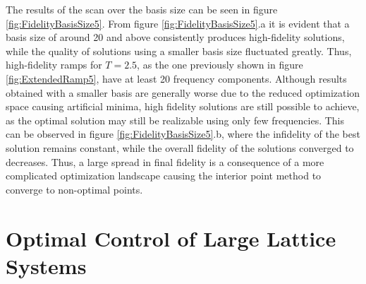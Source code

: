 The results of the scan over the basis size can be seen in figure \ref{fig:FidelityBasisSize5}. From figure \ref{fig:FidelityBasisSize5}.a it is evident that a basis size of around 20 and above consistently produces high-fidelity solutions, while the quality of solutions using a smaller basis size fluctuated greatly. Thus, high-fidelity ramps for $T = 2.5$, as the one previously shown in figure \ref{fig:ExtendedRamp5}, have at least 20 frequency components. Although results obtained with a smaller basis are generally worse due to the reduced optimization space causing artificial minima, high fidelity solutions are still possible to achieve, as the optimal solution may still be realizable using only few frequencies. This can be observed in figure \ref{fig:FidelityBasisSize5}.b, where the infidelity of the best solution remains constant, while the overall fidelity of the solutions converged to decreases. Thus, a large spread in final fidelity is a consequence of a more complicated optimization landscape causing the interior point method to converge to non-optimal points.


\section{Optimal Control of Large Lattice Systems} \label{sec:20partOptimization}